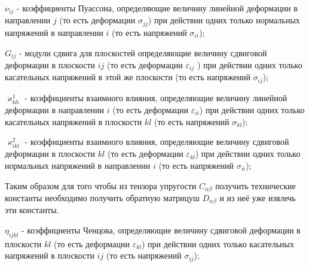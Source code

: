 \documentclass[a4paper,12pt]{article}
\begin{document}
$\nu_{ij}$ - коэффициенты Пуассона, определяющие величину линейной деформации в направлении $j$ (то есть деформации $\sigma_{jj}$) при действии одних только нормальных напряжений в направлении $i$ (то есть напряжений $\sigma_{ii}$);

$G_{ij}$ - модули сдвига для плоскостей определяющие величину сдвиговой деформации в плоскости $ij$ (то есть деформации $\varepsilon_{ij}$ ) при действии одних только касательных напряжений в этой же плоскости (то есть напряжений $\sigma_{ij}$);

$\varkappa^1_{kli}$ - коэффициенты взаимного влияния, определяющие величину линейной деформации в направлении $i$ (то есть деформации $\varepsilon_{ii}$) при действии одних только касательных напряжений в плоскости $kl$ (то есть напряжений $\sigma_{kl}$);

$\varkappa^2_{ikl}$ - коэффициенты взаимного влияния, определяющие величину сдвиговой деформации в плоскости $kl$ (то есть деформации $\varepsilon_{kl}$) при действии одних только нормальных напряжений в направлении $i$ (то есть напряжений $\sigma_{ii}$);

Таким образом для того чтобы из тензора упругости $C_{\alpha\beta}$ получить технические константы необходимо получить обратную матрицуш $D_{\alpha\beta}$ и из неё уже извлечь эти константы.

$\eta_{ijkl}$ - коэффициенты Ченцова, определяющие величину сдвиговой деформации в плоскости $kl$ (то есть деформации $\varepsilon_{kl}$) при действии одних только касательных напряжений в плоскости $ij$ (то есть напряжений $\sigma_{ij}$);
\end{document}
